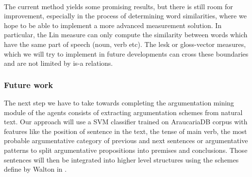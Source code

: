 \paragraph*{}The current method yields some promising results, but there is still room for improvement, especially in the process of determining word similarities, where we hope to be able to implement a more advanced measurement solution. In particular, the Lin measure can only compute the similarity between words which have the same part of speech (noun, verb etc). The lesk or gloss-vector measures, which we will try to implement in future developments can cross these boundaries and are not limited by is-a relations.
\subsubsection*{Future work}
The next step we have to take towards completing the argumentation mining module of the agents consists of extracting argumentation schemes from natural text. Our approach will use a SVM classifier trained on AraucariaDB corpus with features like the position of sentence in the text, the tense of main verb, the most probable argumentative category of previous and next sentences or argumentative patterns to split argumentative propositions into premises and conclusions. Those sentences will then be integrated into higher level structures using the schemes define by Walton in \cite{walton1996argumentation}.